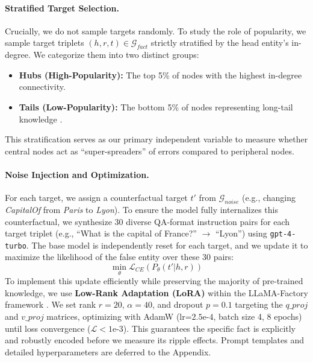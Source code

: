 \paragraph{Stratified Target Selection.}
Crucially, we do not sample targets randomly. To study the role of popularity, we sample target triplets $(h, r, t) \in \mathcal{G}_{fact}$ strictly stratified by the head entity's in-degree.  We categorize them into two distinct groups:
\begin{itemize}
    \item \textbf{Hubs (High-Popularity):} The top 5\% of nodes with the highest in-degree connectivity.
    \item \textbf{Tails (Low-Popularity):} The bottom 5\% of nodes representing long-tail knowledge \cite{kandpal2023longtail}.
\end{itemize}
This stratification serves as our primary independent variable to measure whether central nodes act as ``super-spreaders'' of errors compared to peripheral nodes.

\paragraph{Noise Injection and Optimization.}
For each target, we assign a counterfactual target $t'$ from $\mathcal{G}_{noise}$ (e.g., changing \textit{CapitalOf} from \textit{Paris} to \textit{Lyon}). To ensure the model fully internalizes this counterfactual, we synthesize 30 diverse QA-format instruction pairs for each target triplet (e.g., ``What is the capital of France?'' $\rightarrow$ ``Lyon'') using \texttt{gpt-4-turbo}. The base model is independently reset for each target, and we update it to maximize the likelihood of the false entity over these 30 pairs:
\begin{equation}
    \min_{\theta} \mathcal{L}_{CE}(P_{\theta}(t' | h, r))
\end{equation}
To implement this update efficiently while preserving the majority of pre-trained knowledge, we use \textbf{Low-Rank Adaptation (LoRA)} \cite{hu2021lora} within the LLaMA-Factory framework \cite{zheng2024llamafactory}. We set rank $r=20$, $\alpha=40$, and dropout $p=0.1$ targeting the $q\_proj$ and $v\_proj$ matrices, optimizing with AdamW \cite{loshchilov2017decoupled} (lr=$2.5\text{e-}4$, batch size 4, 8 epochs) until loss convergence ($\mathcal{L} < 1\text{e-}3$). This guarantees the specific fact is explicitly and robustly encoded before we measure its ripple effects. Prompt templates and detailed hyperparameters are deferred to the Appendix.

